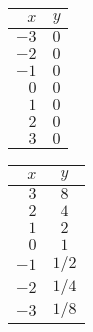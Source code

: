 \documentclass[12pt]{article}
\theoremstyle{definition}
\begin{document}
\begin{multicols}{4}
\begin{tabular}{r|r}
$x$ & $y$\\
\hline
$-3$ & $0$\\
$-2$ & $0$\\
$-1$ & $0$\\
$0$ & $0$\\
$1$ & $0$\\
$2$ & $0$\\
$3$ & $0$
\end{tabular}
\hspace{1in}
\begin{tabular}{r|c}
$x$ & $y$\\
\hline
$3$ & $8$\\
$2$ & $4$\\
$1$ & $2$\\
$0$ & $1$\\
$-1$ & $1/2$\\
$-2$ & $1/4$\\
$-3$ & $1/8$
\end{tabular}
\end{multicols}
\newpage
\end{document}
